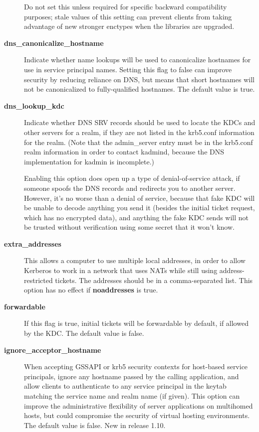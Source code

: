 \documentclass[letterpaper,10pt,english]{sphinxmanual}
\begin{document}
\begin{description}
Do not set this unless required for specific backward
compatibility purposes; stale values of this setting can prevent
clients from taking advantage of new stronger enctypes when the
libraries are upgraded.

\item[{\textbf{dns\_canonicalize\_hostname}}] \leavevmode
Indicate whether name lookups will be used to canonicalize
hostnames for use in service principal names.  Setting this flag
to false can improve security by reducing reliance on DNS, but
means that short hostnames will not be canonicalized to
fully-qualified hostnames.  The default value is true.

\item[{\textbf{dns\_lookup\_kdc}}] \leavevmode
Indicate whether DNS SRV records should be used to locate the KDCs
and other servers for a realm, if they are not listed in the
krb5.conf information for the realm.  (Note that the admin\_server
entry must be in the krb5.conf realm information in order to
contact kadmind, because the DNS implementation for kadmin is
incomplete.)

Enabling this option does open up a type of denial-of-service
attack, if someone spoofs the DNS records and redirects you to
another server.  However, it's no worse than a denial of service,
because that fake KDC will be unable to decode anything you send
it (besides the initial ticket request, which has no encrypted
data), and anything the fake KDC sends will not be trusted without
verification using some secret that it won't know.

\item[{\textbf{extra\_addresses}}] \leavevmode
This allows a computer to use multiple local addresses, in order
to allow Kerberos to work in a network that uses NATs while still
using address-restricted tickets.  The addresses should be in a
comma-separated list.  This option has no effect if
\textbf{noaddresses} is true.

\item[{\textbf{forwardable}}] \leavevmode
If this flag is true, initial tickets will be forwardable by
default, if allowed by the KDC.  The default value is false.

\item[{\textbf{ignore\_acceptor\_hostname}}] \leavevmode
When accepting GSSAPI or krb5 security contexts for host-based
service principals, ignore any hostname passed by the calling
application, and allow clients to authenticate to any service
principal in the keytab matching the service name and realm name
(if given).  This option can improve the administrative
flexibility of server applications on multihomed hosts, but could
compromise the security of virtual hosting environments.  The
default value is false.  New in release 1.10.


\end{description}
\end{document}
